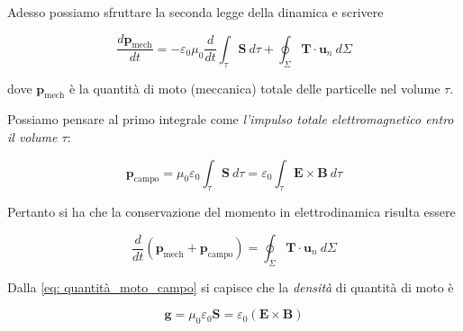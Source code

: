 Adesso possiamo sfruttare la seconda legge della dinamica e scrivere 

\begin{tcolorbox}[colback=yellow!10!white, colframe=orange!70!black, boxrule=0.8pt]
\begin{equation}
    \frac{d \mathbf{p}_{\text{mech}}}{dt} = - \varepsilon_0 \mu_0 \frac{d}{dt} \int_{\tau} \mathbf{S} \ d\tau + \oint_{\Sigma} \mathbf{T} \cdot \mathbf{u}_n \ d\Sigma
\end{equation}
\end{tcolorbox}

dove $\mathbf{p}_{\text{mech}}$ è la quantità di moto (meccanica) totale delle particelle nel volume $\tau$.

\newpage

Possiamo pensare al primo integrale come \emph{l'impulso totale elettromagnetico entro il volume $\tau$}:

\begin{tcolorbox}[colback=yellow!10!white, colframe=orange!70!black, boxrule=0.8pt]
\begin{equation} \label{eq: quantità_moto_campo}
    \mathbf{p}_{\text{campo}} = \mu_0 \varepsilon_0 \int_{\tau} \mathbf{S} \ d\tau = \varepsilon_0 \int_{\tau} \mathbf{E} \times \mathbf{B} \ d\tau 
\end{equation}
\end{tcolorbox}

Pertanto si ha che la conservazione del momento in elettrodinamica risulta essere 

\begin{tcolorbox}[colback=yellow!10!white, colframe=orange!70!black, boxrule=0.8pt]
\begin{equation}
    \frac{d}{dt} (\mathbf{p}_{\text{mech}} + \mathbf{p}_{\text{campo}}) = \oint_{\Sigma} \mathbf{T} \cdot \mathbf{u}_n \ d\Sigma
\end{equation}
\end{tcolorbox}

Dalla \ref{eq: quantità_moto_campo} si capisce che la \emph{densità} di quantità di moto  è 

\begin{tcolorbox}[colback=yellow!10!white, colframe=orange!70!black, boxrule=0.8pt]
\begin{equation}
    \mathbf{g} = \mu_0 \varepsilon_0 \mathbf{S} = \varepsilon_0 (\mathbf{E} \times \mathbf{B})
\end{equation}
\end{tcolorbox}

